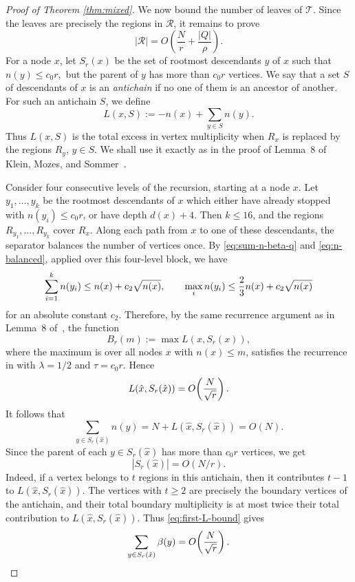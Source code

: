 \documentclass[11pt]{article}
\theoremstyle{plain}
\theoremstyle{definition}
\theoremstyle{remark}
\begin{document}
\begin{proof}[Proof of Theorem \ref{thm:mixed}]
We now bound the number of leaves of \(\mathcal T\). Since the leaves are precisely the regions in \(\mathcal R\), it remains to prove
\[
|\mathcal R|=O\!\left(\frac{N}{r}+\frac{|Q|}{\rho}\right).
\]
For a node \(x\), let \(S_r(x)\) be the set of rootmost descendants \(y\) of \(x\) such that $n(y)\le c_0r,$ but the parent of \(y\) has more than \(c_0r\) vertices. We say that a set $S$ of descendants of \(x\) is an \emph{antichain} if no one of them is an ancestor of another. For such an antichain \(S\), we define
\[
L(x,S):=-n(x)+\sum_{y\in S} n(y).
\]
Thus \(L(x,S)\) is the total excess in vertex multiplicity when
\(R_x\) is replaced by the regions \(R_y\), \(y\in S\). We shall use it exactly
as in the proof of Lemma~8 of Klein, Mozes, and Sommer~\cite{KMS13}.

Consider four consecutive levels of the recursion, starting at a node \(x\).
Let \(y_1,\ldots,y_k\) be the rootmost descendants of \(x\) which either have
already stopped with \(n(y_i)\le c_0r\), or have depth \(d(x)+4\). Then
\(k\le 16\), and the regions \(R_{y_1},\ldots,R_{y_k}\) cover \(R_x\).
Along each path from \(x\) to one of these descendants, the separator balances
the number of vertices once. By \eqref{eq:sum-n-beta-q} and \eqref{eq:n-balanced},
applied over this four-level block, we have
\[
\sum_{i=1}^k n(y_i)\le n(x)+c_2\sqrt{n(x)},
\qquad
\max_i n(y_i)\le {2\over 3}n(x)+c_2\sqrt{n(x)}
\]
for an absolute constant \(c_2\). Therefore, by the same recurrence argument as
in Lemma~8 of~\cite{KMS13}, the function
\[
B_r(m):=\max L(x,S_r(x)),
\]
where the maximum is over all nodes \(x\) with \(n(x)\le m\), satisfies the
recurrence in  with \(\lambda=1/2\) and \(\tau=c_0r\). Hence
\begin{equation}\label{eq:first-L-bound}
L(\hat x,S_r(\hat x))=O\!\left({N\over \sqrt r}\right).
\end{equation}
It follows that
\[
\sum_{y\in S_r(\hat x)} n(y)
=
N+L(\hat x,S_r(\hat x))
=O(N).
\]
Since the parent of each \(y\in S_r(\hat x)\) has more than \(c_0r\) vertices, we get
\begin{equation}\label{eq:Sr-size}
|S_r(\hat x)|=O(N/r).
\end{equation}
Indeed, if a vertex belongs to \(t\) regions in this antichain, then it contributes \(t-1\) to \(L(\hat x,S_r(\hat x))\). The vertices with \(t\ge 2\) are precisely the boundary vertices of the antichain, and their total boundary multiplicity is at most twice their total contribution to \(L(\hat x,S_r(\hat x))\). Thus \eqref{eq:first-L-bound} gives
\begin{equation}\label{eq:boundary-sum}
\sum_{y\in S_r(\hat x)} \beta(y)
=
O\!\left({N\over \sqrt r}\right).
\end{equation}


\end{proof}
\end{document}
